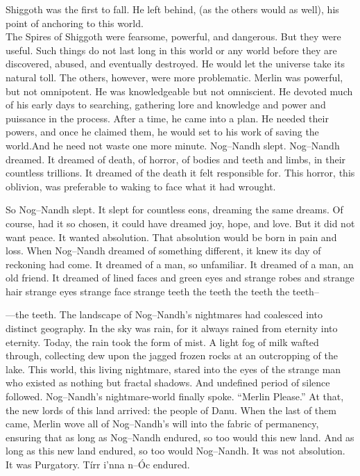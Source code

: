 \SomeVSpace
Shiggoth was the first to fall. He left behind, (as the others would as well), his point of anchoring to this world.\\The Spires of Shiggoth were fearsome, powerful, and dangerous. But they were useful. Such things do not last long in this world or any world before they are discovered, abused, and eventually destroyed. He would let the universe take its natural toll.
\SmallVSpace
The others, however, were more problematic. Merlin was powerful, but not omnipotent. He was knowledgeable but not omniscient. He devoted much of his early days to searching, gathering lore and knowledge and power and puissance in the process. After a time, he came into a plan. He needed their powers, and once he claimed them, he would set to his work of saving the world.\SomeVSpace And he need not waste one more minute.
\doubleline
Nog\mbox{--}Nandh slept. Nog\mbox{--}Nandh dreamed. It dreamed of death, of horror, of bodies and teeth and limbs, in their countless trillions. It dreamed of the death it felt responsible for. This horror, this oblivion, was preferable to waking to face what it had wrought.

So Nog\mbox{--}Nandh slept. It slept for countless eons, dreaming the same dreams. Of course, had it so chosen, it could have dreamed joy, hope, and love. But it did not want peace. It wanted absolution. That absolution would be born in pain and loss.
\SmallVSpace
When Nog\mbox{--}Nandh dreamed of something different, it knew its day of reckoning had come. It dreamed of a man, so unfamiliar. It dreamed of a man, an old friend. It dreamed of lined faces and green eyes and strange robes and strange hair strange eyes strange face strange teeth the teeth the teeth the teeth\mbox{--}

\simpleline


\mbox{---}the teeth. The landscape of Nog\mbox{--}Nandh’s nightmares had coalesced into distinct geography. In the sky was rain, for it always rained from eternity into eternity. Today, the rain took the form of mist. A light fog of milk wafted through, collecting dew upon the jagged frozen rocks at an outcropping of the lake.
\SmallVSpace
This world, this living nightmare, stared into the eyes of the strange man who existed as nothing but fractal shadows. And undefined period of silence followed. Nog\mbox{--}Nandh’s nightmare-world finally spoke.
\SomeVSpace
“Merlin{\el} Please.”
\SmallVSpace
At that, the new lords of this land arrived: the people of Danu. When the last of them came, Merlin wove all of Nog\mbox{--}Nandh’s will into the fabric of permanency, ensuring that as long as Nog\mbox{--}Nandh endured, so too would this new land. And as long as this new land endured, so too would Nog\mbox{--}Nandh. It was not absolution. It was Purgatory.
\SomeVSpace
Tírr i’nna n\mbox{--}Óc endured.